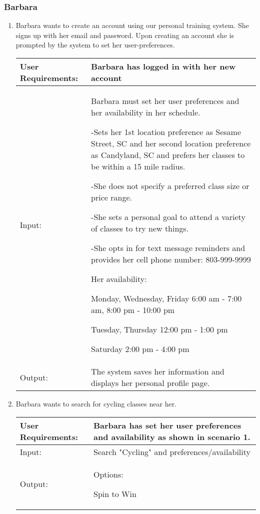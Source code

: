 \documentclass[12pt]{article}
\begin{document}
\subsubsection{Barbara}
\begin{enumerate}
\item Barbara wants to create an account using our personal training system. She signs up with her email and password. Upon creating an account she is prompted by the system to set her user-preferences.

\begin{tabular}{| m{4cm} | m{11cm}|}
\hline
User Requirements: & Barbara has logged in with her new account \\
\hline
Input: & Barbara must set her user preferences and her availability in her schedule. 
\newline

-Sets her 1st location preference as Sesame Street, SC and her second location preference as Candyland, SC and prefers her classes to be within a 15 mile radius.

-She does not specify a preferred class size or price range.

-She sets a personal goal to attend a variety of classes to try new things.

-She opts in for text message reminders and provides her cell phone number: 803-999-9999
\newline

Her availability:

Monday, Wednesday, Friday 6:00 am - 7:00 am, 8:00 pm - 10:00 pm

Tuesday, Thursday 12:00 pm - 1:00 pm

Saturday 2:00 pm - 4:00 pm
\\
\hline
Output: & The system saves her information and displays her personal profile page. \\ 
\hline
\end{tabular}

\item Barbara wants to search for cycling classes near her. 

\begin{tabular}{| m{4cm} | m{11cm} |}
\hline
User Requirements: & Barbara has set her user preferences and availability as shown in scenario 1. \\ 
\hline
Input: & Search "Cycling" and preferences/availability \\
\hline
Output: & Options:

Spin to Win 


\end{tabular}
\end{enumerate}
\end{document}
